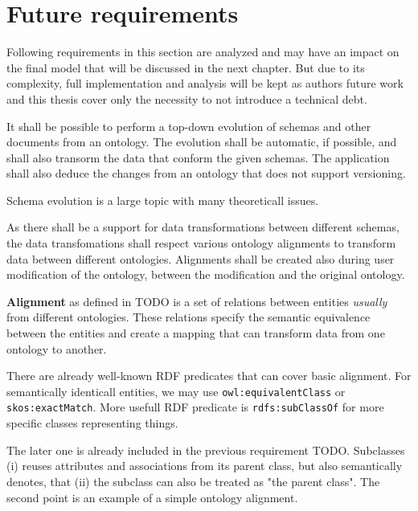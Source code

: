 
\section{Future requirements}

Following requirements in this section are analyzed and may have an impact on the final model that will be discussed in the next chapter. But due to its complexity, full implementation and analysis will be kept as authors future work and this thesis cover only the necessity to not introduce a technical debt.

\begin{requirement}
    It shall be possible to perform a top-down evolution of schemas and other documents from an ontology. The evolution shall be automatic, if possible, and shall also transorm the data that conform the given schemas. The application shall also deduce the changes from an ontology that does not support versioning.
\end{requirement}

Schema evolution is a large topic with many theoreticall issues.




\begin{requirement}
    As there shall be a support for data transformations between different schemas, the data transfomations shall respect various ontology alignments to transform data between different ontologies. Alignments shall be created also during user modification of the ontology, between the modification and the original ontology.
\end{requirement}

\textbf{Alignment} as defined in TODO is a set of relations between entities \textit{usually} from different ontologies. These relations specify the semantic equivalence between the entities and create a mapping that can transform data from one ontology to another.

There are already well-known RDF predicates that can cover basic alignment. For semantically identicall entities, we may use \verb|owl:equivalentClass| or \verb|skos:exactMatch|. More usefull RDF predicate is \verb|rdfs:subClassOf| for more specific classes representing things.

The later one is already included in the previous requirement TODO. Subclasses (i) reuses attributes and associations from its parent class, but also semantically denotes, that (ii) the subclass can also be treated as "the parent class". The second point is an example of a simple ontology alignment.

\begin{showcase}
\end{showcase}
